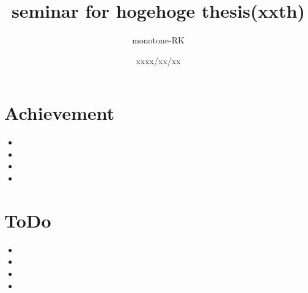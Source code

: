 \documentclass[paper,a4paper]{article}
\title{seminar for hogehoge thesis(xxth)}
\author{monotone-RK}
\date{xxxx/xx/xx}
\begin{document}
\maketitle

\section{Achievement}
\begin{itemize}
 \item 
 \item 
 \item 
 \item 
\end{itemize}

\section{ToDo}
\begin{itemize}
 \item 
 \item 
 \item 
 \item 
\end{itemize}
\end{document}
